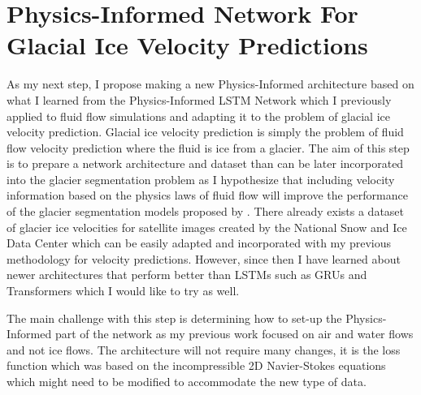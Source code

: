 \chapter{Physics-Informed Network For Glacial Ice Velocity Predictions}
As my next step, I propose making a new Physics-Informed architecture based on what I learned from the Physics-Informed LSTM Network \cite{Perez2022} which I previously applied to fluid flow simulations and adapting it to the problem of glacial ice velocity prediction. Glacial ice velocity prediction is simply the problem of fluid flow velocity prediction where the fluid is ice from a glacier. The aim of this step is to prepare a network architecture and dataset than can be later incorporated into the glacier segmentation problem as I hypothesize that including velocity information based on the physics laws of fluid flow will improve the performance of the glacier segmentation models proposed by \cite{Bibek2023}. There already exists a dataset of glacier ice velocities \cite{GoLIVE1} for satellite images created by the National Snow and Ice Data Center which can be easily adapted and incorporated with my previous methodology for velocity predictions. However, since then I have learned about newer architectures that perform better than LSTMs \cite{LSTM} such as GRUs \cite{GRU} and Transformers \cite{VIT} which I would like to try as well.

The main challenge with this step is determining how to set-up the Physics-Informed part of the network as my previous work focused on air and water flows and not ice flows. The architecture will not require many changes, it is the loss function which was based on the incompressible 2D Navier-Stokes equations which might need to be modified to accommodate the new type of data.